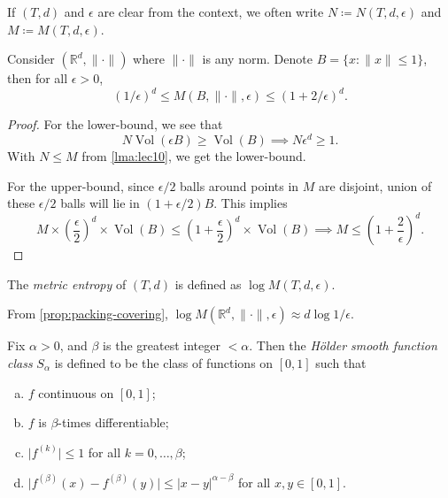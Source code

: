 \begin{notation}
  If \((T, d)\) and \(\epsilon \) are clear from the context, we often write \(N \coloneqq N(T, d, \epsilon )\) and \(M \coloneqq M(T, d, \epsilon )\).
\end{notation}

\begin{proposition}\label{prop:packing-covering}
  Consider \((\mathbb{R} ^d, \lVert \cdot \rVert )\) where \(\lVert \cdot \rVert \) is any norm. Denote \(B = \{ x \colon \lVert x \rVert \leq 1 \} \), then for all \(\epsilon > 0\),
  \[
    (1 / \epsilon) ^d \leq M(B, \lVert \cdot \rVert , \epsilon ) \leq (1 + 2 / \epsilon )^d.
  \]
\end{proposition}
\begin{proof}
  For the lower-bound, we see that
  \[
    N \mathop{\mathrm{Vol}}(\epsilon B) \geq \mathop{\mathrm{Vol}}(B)
    \implies N \epsilon ^d \geq 1.
  \]
  With \(N \leq M\) from \autoref{lma:lec10}, we get the lower-bound.

  For the upper-bound, since \(\epsilon / 2\) balls around points in \(M\) are disjoint, union of these \(\epsilon / 2\) balls will lie in \((1 + \epsilon / 2)B\). This implies
  \[
    M \times \left( \frac{\epsilon}{2} \right) ^d \times \mathop{\mathrm{Vol}}(B) \leq \left( 1 + \frac{\epsilon}{2} \right) ^d \times \mathop{\mathrm{Vol}}(B)
    \implies M \leq \left( 1 + \frac{2}{\epsilon } \right) ^d.
  \]
\end{proof}

\begin{definition}\label{def:metric-entropy}
  The \emph{metric entropy} of \((T, d)\) is defined as \(\log M(T, d, \epsilon )\).
\end{definition}

\begin{note}
  From \autoref{prop:packing-covering}, \(\log M(\mathbb{R} ^d, \lVert \cdot \rVert , \epsilon ) \approx d \log 1 / \epsilon \).
\end{note}

\begin{definition}\label{def:Holder-smooth-function-class}
  Fix \(\alpha > 0\), and \(\beta \) is the greatest integer \(< \alpha \). Then the \emph{Hölder smooth function class} \(S_\alpha \) is defined to be the class of functions on \([0, 1]\) such that
  \begin{enumerate}[(a)]
    \item \(f\) continuous on \([0, 1]\);
    \item \(f\) is \(\beta \)-times differentiable;
    \item \(\vert f^{(k)} \vert \leq 1\) for all \(k = 0, \dots , \beta \);
    \item \(\vert f^{(\beta )}(x) - f^{(\beta )}(y) \vert \leq \vert x - y \vert ^{\alpha - \beta }\) for all \(x, y \in [0, 1]\).
  \end{enumerate}
\end{definition}

